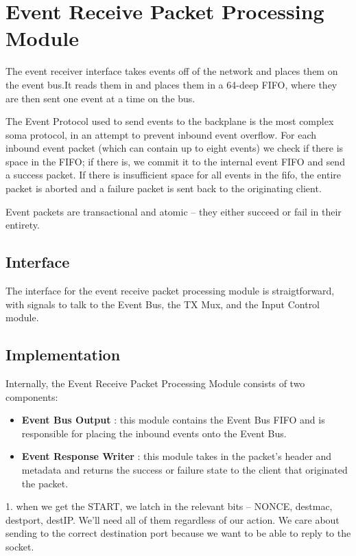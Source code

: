 \section{Event Receive Packet Processing Module}

The event receiver interface takes events off of the network and
places them on the event bus.It reads them in and places them in a
64-deep FIFO, where they are then sent one event at a time on the bus.

The Event Protocol used to send events to the backplane is the most
complex soma protocol, in an attempt to prevent inbound event
overflow. For each inbound event packet (which can contain up to eight
events) we check if there is space in the FIFO; if there is, we commit
it to the internal event FIFO and send a success packet. If there is
insufficient space for all events in the fifo, the entire packet is
aborted and a failure packet is sent back to the originating client.

Event packets are transactional and atomic -- they either succeed or
fail in their entirety.

\subsection{Interface}
The interface for the event receive packet processing module is
straigtforward, with signals to talk to the Event Bus, the TX Mux, and
the Input Control module.

\subsection{Implementation}

Internally, the Event Receive Packet Processing Module consists of two components:
\begin{itemize}
\item \textbf{Event Bus Output} : this module contains the Event Bus FIFO and is responsible for placing the inbound events onto the Event Bus. 
\item \textbf{Event Response Writer} : this module takes in the packet's header and metadata and returns the success or failure state to the client that originated the packet. 
\end{itemize}

1. when we get the START, we latch in the relevant bits -- NONCE,
   destmac, destport, destIP. We'll need all of them regardless of our
   action. We care about sending to the correct destination port
   because we want to be able to reply to the socket.

